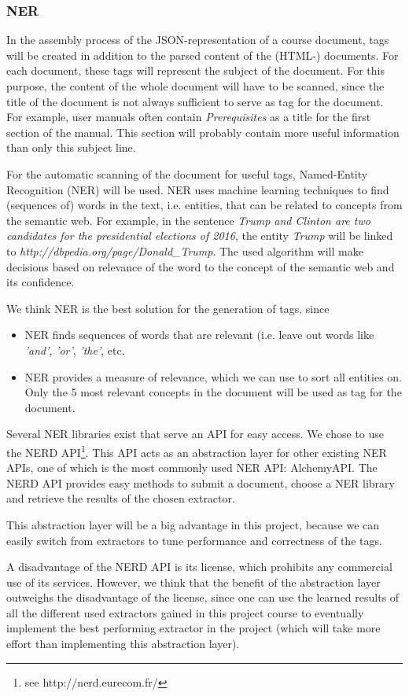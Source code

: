 \documentclass[a4paper,12pt]{article}
\begin{document}
\subsubsection*{NER}
In the assembly process of the JSON-representation of a course document, tags will be created in addition to the parsed content of the (HTML-) documents. For each document, these tags will represent the subject of the document. For this purpose, the content of the whole document will have to be scanned, since the title of the document is not always sufficient to serve as tag for the document. For example, user manuals often contain \textit{Prerequisites} as a title for the first section of the manual. This section will probably contain more useful information than only this subject line.\par
For the automatic scanning of the document for useful tags, Named-Entity Recognition (NER) will be used. NER uses machine learning techniques to find (sequences of) words in the text, i.e. entities, that can be related to concepts from the semantic web. For example, in the sentence \textit{Trump and Clinton are two candidates for the presidential elections of 2016}, the entity \textit{Trump} will be linked to \textit{http://dbpedia.org/page/Donald\_Trump}. The used algorithm will make decisions based on relevance of the word to the concept of the semantic web and its confidence.\par
We think NER is the best solution for the generation of tags, since
\begin{itemize}
\item NER finds sequences of words that are relevant (i.e. leave out words like \textit{'and'}, \textit{'or'}, \textit{'the'}, etc.
\item NER provides a measure of relevance, which we can use to sort all entities on. Only the 5 most relevant concepts in the document will be used as tag for the document.
\end{itemize}\par
Several NER libraries exist that serve an API for easy access. We chose to use the NERD API\footnote{see http://nerd.eurecom.fr/}. This API acts as an abstraction layer for other existing NER APIs, one of which is the most commonly used NER API: AlchemyAPI. The NERD API provides easy methods to submit a document, choose a NER library and retrieve the results of the chosen extractor.\par
This abstraction layer will be a big advantage in this project, because we can easily switch from extractors to tune performance and correctness of the tags.\par
A disadvantage of the NERD API is its license, which prohibits any commercial use of its services. However, we think that the benefit of the abstraction layer outweighs the disadvantage of the license, since one can use the learned results of all the different used extractors gained in this project course to eventually implement the best performing extractor in the project (which will take more effort than implementing this abstraction layer).\par
\end{document}
